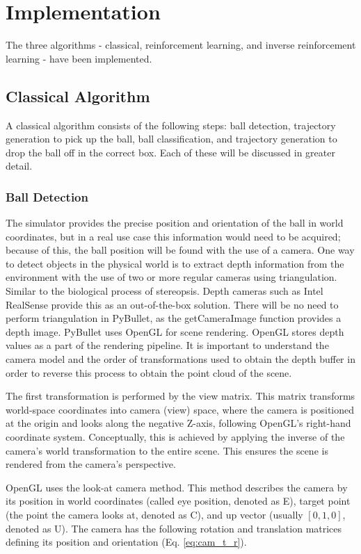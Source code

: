\section{Implementation}
The three algorithms - classical, reinforcement learning, and inverse reinforcement learning - have been implemented.

\subsection{Classical Algorithm}
A classical algorithm consists of the following steps: ball detection, trajectory generation to pick up the ball, ball classification, and trajectory generation to drop the ball off in the correct box. Each of these will be discussed in greater detail.

\subsubsection{Ball Detection}
The simulator provides the precise position and orientation of the ball in world coordinates, but in a real use case this information would need to be acquired; because of this, the ball position will be found with the use of a camera. One way to detect objects in the physical world is to extract depth information from the environment with the use of two or more regular cameras using triangulation. Similar to the biological process of stereopsis. Depth cameras such as Intel RealSense provide this as an out-of-the-box solution. There will be no need to perform triangulation in PyBullet, as the getCameraImage function provides a depth image. PyBullet uses OpenGL for scene rendering. OpenGL stores depth values as a part of the rendering pipeline. It is important to understand the camera model and the order of transformations used to obtain the depth buffer in order to reverse this process to obtain the point cloud of the scene.

\bigskip \noindent
The first transformation is performed by the view matrix. This matrix transforms world-space coordinates into camera (view) space, where the camera is positioned at the origin and looks along the negative Z-axis, following OpenGL's right-hand coordinate system. Conceptually, this is achieved by applying the inverse of the camera's world transformation to the entire scene. This ensures the scene is rendered from the camera's perspective.

\bigskip \noindent
OpenGL uses the look-at camera method. This method describes the camera by its position in world coordinates (called eye position, denoted as E), target point (the point the camera looks at, denoted as C), and up vector (usually $[0, 1, 0]$, denoted as U). The camera has the following rotation and translation matrices defining its position and orientation (Eq. \ref{eq:cam_t_r}).

